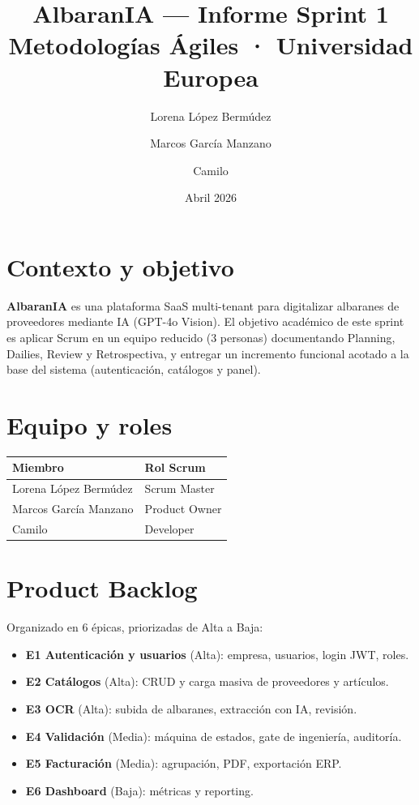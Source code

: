 \documentclass[11pt,a4paper]{article}
\title{\textbf{AlbaranIA} — Informe Sprint 1 \\ \large Metodologías Ágiles · Universidad Europea}
\author{Lorena López Bermúdez \and Marcos García Manzano \and Camilo}
\date{Abril 2026}
\begin{document}
\maketitle

\section{Contexto y objetivo}
\textbf{AlbaranIA} es una plataforma SaaS multi-tenant para digitalizar albaranes de proveedores mediante IA (GPT-4o Vision). El objetivo académico de este sprint es aplicar Scrum en un equipo reducido (3 personas) documentando Planning, Dailies, Review y Retrospectiva, y entregar un incremento funcional acotado a la base del sistema (autenticación, catálogos y panel).

\section{Equipo y roles}

\begin{tabular}{ll}
\toprule
\textbf{Miembro} & \textbf{Rol Scrum} \\
\midrule
Lorena López Bermúdez & Scrum Master \\
Marcos García Manzano & Product Owner \\
Camilo & Developer \\
\bottomrule
\end{tabular}

\section{Product Backlog}
Organizado en 6 épicas, priorizadas de Alta a Baja:

\begin{itemize}
\item \textbf{E1 Autenticación y usuarios} (Alta): empresa, usuarios, login JWT, roles.
\item \textbf{E2 Catálogos} (Alta): CRUD y carga masiva de proveedores y artículos.
\item \textbf{E3 OCR} (Alta): subida de albaranes, extracción con IA, revisión.
\item \textbf{E4 Validación} (Media): máquina de estados, gate de ingeniería, auditoría.
\item \textbf{E5 Facturación} (Media): agrupación, PDF, exportación ERP.
\item \textbf{E6 Dashboard} (Baja): métricas y reporting.
\end{itemize}
\end{document}
